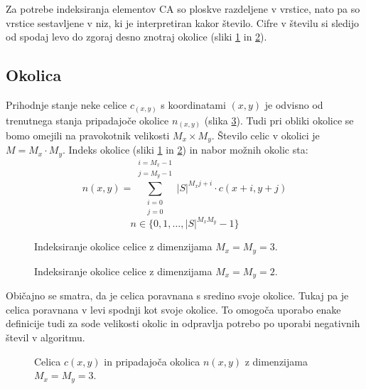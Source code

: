\documentclass[12pt,a4paper,openany,twoside]{book}
\begin{document}
Za potrebe indeksiranja elementov CA so ploskve razdeljene v vrstice,
nato pa so vrstice sestavljene v niz, ki je interpretiran kakor število.
Cifre v številu si sledijo od spodaj levo do zgoraj desno znotraj okolice
(sliki \ref{neighborhood_index_moore} in \ref{neighborhood_index_quad}).

\subsection{Okolica}

Prihodnje stanje neke celice \(c_(x,y)\) s koordinatami \((x,y)\)
je odvisno od trenutnega stanja pripadajoče okolice \(n_(x,y)\) (slika \ref{neighborhood}).
Tudi pri obliki okolice se bomo omejili na pravokotnik velikosti \(M_x \times M_y\).
Število celic v okolici je \(M=M_x \cdot M_y\).
Indeks okolice (sliki \ref{neighborhood_index_moore} in \ref{neighborhood_index_quad})
in nabor možnih okolic sta:
\begin{equation}
n(x,y) = \sum_{\substack{i=0 \\ j=0}}^{\substack{i=M_x-1 \\ j=M_y-1}} |S|^{M_x j + i} \cdot c(x+i,y+j)
\end{equation}
\begin{equation}
n \in \{0, 1, \ldots, |S|^{M_x M_y}-1\}
\end{equation}

\begin{figure}[htb]
\centerline{}
\caption[Indeksiranje okolice \(3 \times 3\).]{Indeksiranje okolice celice z dimenzijama \(M_x=M_y=3\).}
\label{neighborhood_index_moore}
\end{figure}

\begin{figure}[htb]
\centerline{}
\caption[Indeksiranje okolice \(2 \times 2\).]{Indeksiranje okolice celice z dimenzijama \(M_x=M_y=2\).}
\label{neighborhood_index_quad}
\end{figure}

Običajno se smatra, da je celica poravnana s sredino svoje okolice.
Tukaj pa je celica poravnana v levi spodnji kot svoje okolice.
To omogoča uporabo enake definicije tudi za sode velikosti okolic in
odpravlja potrebo po uporabi negativnih števil v algoritmu.

\begin{figure}[htb]
\centerline{}
\caption[Celica in pripadajoča okolica.]{Celica \(c(x,y)\) in pripadajoča okolica \(n(x,y)\) z dimenzijama \(M_x=M_y=3\).}
\label{neighborhood}
\end{figure}
\end{document}
